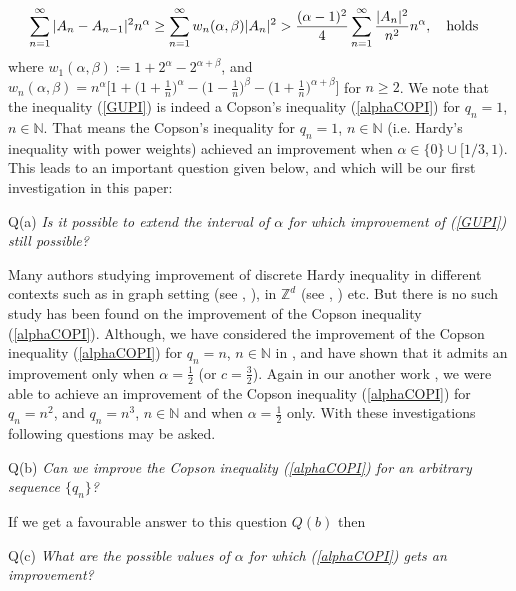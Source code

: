 \documentclass[12pt]{amsart}
\theoremstyle{definition}
\theoremstyle{plain}
\theoremstyle{definition}
\numberwithin{equation}{section}
\begin{document}
\begin{align}{\label{GUPI}}
\displaystyle\sum_{n=1}^{\infty}|A_{n}-A_{n-1}|^{2}n^{\alpha} &\geq \displaystyle\sum_{n=1}^{\infty}w_{n}(\alpha,\beta)|A_{n}|^{2}>\frac{(\alpha-1)^2}{4}\sum_{n=1}^{\infty}\frac{|A_{n}|^{2}}{n^2}{n}^{\alpha}, ~~~\mbox{holds}
\end{align}where $w_{1}(\alpha,\beta):=1+2^{\alpha}-2^{\alpha+\beta}$, and $w_{n}(\alpha,\beta)=n^{\alpha}\Big[1+\Big(1+\frac{1}{n}\Big)^{\alpha}-\Big(1-\frac{1}{n}\Big)^{\beta}-\Big(1+\frac{1}{n}\Big)^{\alpha+\beta}\Big]$ for $n\geq2$. We note that the inequality (\ref{GUPI}) is indeed a Copson's inequality (\ref{alphaCOPI}) for $q_n=1$, $n\in \mathbb{N}$. That means the Copson's inequality for $q_n=1$, $n\in \mathbb{N}$ (i.e. Hardy's inequality with power weights) achieved an improvement when $\alpha\in \{0\}\cup[1/3, 1)$. This leads to an important question given below, and which will be our first investigation in this paper:
\begin{center}
Q(a) \emph{Is it possible to extend the interval of $\alpha$ for which improvement of (\ref{GUPI}) still possible?}
\end{center}
Many authors studying improvement of discrete Hardy inequality in different contexts such as in graph setting (see \cite{MKRGRAPH}, \cite{MKRRELGRAPH}), in $\mathbb{Z}^d$ (see \cite{HUANGYE}, \cite{MKRGRAPH}) etc. But there is no such study has been found on the improvement of the Copson inequality (\ref{alphaCOPI}). Although, we have considered the improvement of the Copson inequality (\ref{alphaCOPI}) for $q_n=n$, $n\in \mathbb{N}$ in \cite{DASMAN}, and have shown that it admits an improvement only when $\alpha=\frac{1}{2}$ (or $c=\frac{3}{2}$). Again in our another work \cite{DASMAN2}, we were able to achieve an improvement of the Copson inequality (\ref{alphaCOPI}) for $q_n=n^2$, and $q_n=n^3$, $n\in \mathbb{N}$ and when $\alpha=\frac{1}{2}$ only. With these investigations following questions may be asked.
\begin{center}
Q(b) \emph{Can we improve the Copson inequality (\ref{alphaCOPI}) for an arbitrary sequence $\{q_n\}$?}
\end{center}If we get a favourable answer to this question $Q(b)$ then
\begin{center}
Q(c) \emph{What are the possible values of $\alpha$ for which (\ref{alphaCOPI}) gets an improvement?}
\end{center}
\end{document}
